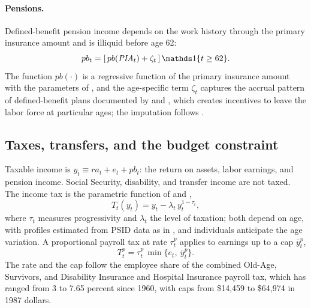 \paragraph{Pensions.}
Defined-benefit pension income depends on the work history through the primary insurance amount and is illiquid before age 62: %
\begin{equation}\label{eq:pension}
pb_t=\left[\,pb(\PIA_t)+\zeta_t\,\right]\ind{t\geq 62}.
\end{equation}
The function $pb(\cdot)$ is a regressive function of the primary insurance amount with the parameters of \citet{Gustman1999}, and the age-specific term $\zeta_t$ captures the accrual pattern of defined-benefit plans documented by \citet{Gustman2000} and \citet{Ippolito1997}, which creates incentives to leave the labor force at particular ages; the imputation follows \citet{french2005effects}. %

\subsection{Taxes, transfers, and the budget constraint}\label{subsec:budget}

Taxable income is $y_t\equiv r a_t+e_t+pb_t$: the return on assets, labor earnings, and pension income. Social Security, disability, and transfer income are not taxed. %
The income tax is the parametric function of \citet{Benabou2002} and \citet{heathcote2017optimal},
\begin{equation}\label{eq:tax}
T_t(y_t)=y_t-\lambda_t\,y_t^{1-\tau_t},
\end{equation}
where $\tau_t$ measures progressivity and $\lambda_t$ the level of taxation; both depend on age, with profiles estimated from PSID data as in \citet{Borella2023}, and individuals anticipate the age variation. %
A proportional payroll tax at rate $\tau^p_t$ applies to earnings up to a cap $\bar y^p_t$,
\begin{equation}\label{eq:payroll}
T^p_t=\tau^p_t\,\min\{e_t,\ \bar y^p_t\}.
\end{equation}
The rate and the cap follow the employee share of the combined Old-Age, Survivors, and Disability Insurance and Hospital Insurance payroll tax, which has ranged from 3 to 7.65 percent since 1960, with caps from \$14,459 to \$64,974 in 1987 dollars. %

